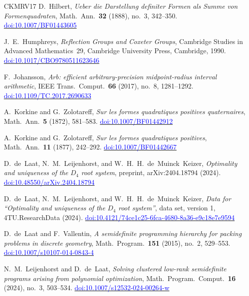 \documentclass[11pt,reqno]{amsart}
\newcommand{\bluelink}[2]{\href{#1}{\textcolor{blue}{#2}}}
\renewcommand{\_}{\origunderscore\allowbreak}
\numberwithin{equation}{section}
\theoremstyle{plain}
\theoremstyle{definition}
\theoremstyle{remark}
\begin{document}
\begin{thebibliography}{CKMRV17}
D.~Hilbert,
\textit{Ueber die Darstellung definiter Formen als Summe von Formenquadraten},
Math.\ Ann.\ \textbf{32} (1888), no.~3, 342--350.
\bluelink{https://doi.org/10.1007/BF01443605}{doi:10.1007/BF01443605}

J.~E.~Humphreys,
\textit{Reflection Groups and Coxeter Groups},
Cambridge Studies in Advanced Mathematics~29,
Cambridge University Press, Cambridge, 1990.
\bluelink{https://doi.org/10.1017/CBO9780511623646}{doi:10.1017/CBO9780511623646}

F.~Johansson,
\textit{Arb: efficient arbitrary-precision midpoint-radius interval arithmetic},
IEEE Trans.\ Comput.\ \textbf{66} (2017), no.~8, 1281--1292.
\bluelink{https://doi.org/10.1109/TC.2017.2690633}{doi:10.1109/TC.2017.2690633}

A.~Korkine and G.~Zolotareff,
\textit{Sur les formes quadratiques positives quaternaires},
Math.\ Ann.\ \textbf{5} (1872), 581--583.
\bluelink{https://doi.org/10.1007/BF01442912}{doi:10.1007/BF01442912}

A.~Korkine and G.~Zolotareff,
\textit{Sur les formes quadratiques positives},
Math.\ Ann.\ \textbf{11} (1877), 242--292.
\bluelink{https://doi.org/10.1007/BF01442667}{doi:10.1007/BF01442667}

D.~de~Laat, N.~M.~Leijenhorst, and W.~H.~H.~de~Muinck~Keizer,
\textit{Optimality and uniqueness of the $D_4$ root system},
preprint, arXiv:2404.18794 (2024).
\bluelink{https://doi.org/10.48550/arXiv.2404.18794}{doi:10.48550/arXiv.2404.18794}

D.~de~Laat, N.~M.~Leijenhorst, and W.~H.~H.~de~Muinck~Keizer,
\textit{Data for ``Optimality and uniqueness of the $D_4$ root system''},
data set, version 1, 4TU.ResearchData (2024).
\bluelink{https://doi.org/10.4121/74ce1c25-6fca-4680-8a36-e9c18e7e9594}{doi:10.4121/74ce1c25-6fca-4680-8a36-e9c18e7e9594}

D.~de~Laat and F.~Vallentin,
\textit{A semidefinite programming hierarchy for packing problems in
discrete geometry},
Math.\ Program.\ \textbf{151} (2015), no.~2, 529--553.
\bluelink{https://doi.org/10.1007/s10107-014-0843-4}{doi:10.1007/s10107-014-0843-4}

N.~M.~Leijenhorst and D.~de~Laat,
\textit{Solving clustered low-rank semidefinite programs arising from
polynomial optimization},
Math.\ Program.\ Comput.\ \textbf{16} (2024), no.~3, 503--534.
\bluelink{https://doi.org/10.1007/s12532-024-00264-w}{doi:10.1007/s12532-024-00264-w}


\end{thebibliography}
\end{document}
